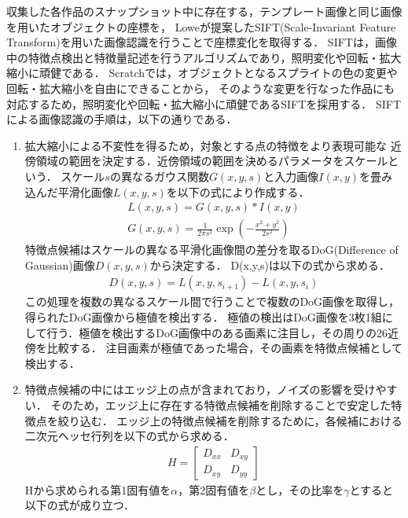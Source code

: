 \documentclass[11pt]{jreport}
\begin{document}
収集した各作品のスナップショット中に存在する，テンプレート画像と同じ画像を用いたオブジェクトの座標を，
Loweが提案したSIFT(Scale-Invariant Feature Transform)\cite{sift}を用いた画像認識を行うことで座標変化を取得する．
SIFTは，画像中の特徴点検出と特徴量記述を行うアルゴリズムであり，照明変化や回転・拡大縮小に頑健である．
Scratchでは，オブジェクトとなるスプライトの色の変更や回転・拡大縮小を自由にできることから，
そのような変更を行なった作品にも対応するため，照明変化や回転・拡大縮小に頑健であるSIFTを採用する．
SIFTによる画像認識の手順は，以下の通りである．
\begin{enumerate}
     \item {} 拡大縮小による不変性を得るため，対象とする点の特徴をより表現可能な
    近傍領域の範囲を決定する．近傍領域の範囲を決めるパラメータをスケールという．
    スケール$s$の異なるガウス関数$G(x,y,s)$と入力画像$I(x,y)$を畳み込んだ平滑化画像$L(x,y,s)$を以下の式により作成する．
    \begin{eqnarray}
        L(x,y,s) = G(x,y,s) * I(x,y) \\
        G(x,y,s) = \frac{1}{2\pi s^2} \exp (- \frac{x^2+y^2}{2s^2})
    \end{eqnarray}
    特徴点候補はスケールの異なる平滑化画像間の差分を取るDoG(Difference of Gaussian)画像$D(x,y,s)$から決定する．
    D(x,y,s)は以下の式から求める．
    \begin{eqnarray}
        D(x,y,s) = L(x,y,s_{i+1}) - L(x,y,s_i)
    \end{eqnarray}
    この処理を複数の異なるスケール間で行うことで複数のDoG画像を取得し，得られたDoG画像から極値を検出する．
    極値の検出はDoG画像を3枚1組にして行う．極値を検出するDoG画像中のある画素に注目し，その周りの26近傍を比較する．
    注目画素が極値であった場合，その画素を特徴点候補として検出する．
    \item {} 特徴点候補の中にはエッジ上の点が含まれており，ノイズの影響を受けやすい．
    そのため，エッジ上に存在する特徴点候補を削除することで安定した特徴点を絞り込む．
    エッジ上の特徴点候補を削除するために，各候補における二次元ヘッセ行列を以下の式から求める．
    \begin{eqnarray}
        H = \begin{bmatrix}
            D_{xx} & D_{xy} \\
            D_{xy} & D_{yy}
        \end{bmatrix}
    \end{eqnarray}
    Hから求められる第1固有値を$\alpha$，第2固有値を$\beta$とし，その比率を$\gamma$とすると以下の式が成り立つ．

\end{enumerate}
\end{document}
